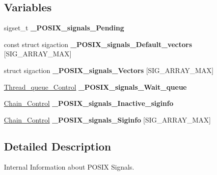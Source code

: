 \subsection*{Variables}
\begin{DoxyCompactItemize}
\item 
\mbox{\label{group__POSIX__SIGNALS_ga9615b840db786240af24ebb295094eac}} 
sigset\+\_\+t {\bfseries \+\_\+\+P\+O\+S\+I\+X\+\_\+signals\+\_\+\+Pending}
\item 
\mbox{\label{group__POSIX__SIGNALS_gaca07bb1b556a5d115a9a7284e7ac6114}} 
const struct sigaction {\bfseries \+\_\+\+P\+O\+S\+I\+X\+\_\+signals\+\_\+\+Default\+\_\+vectors} \mbox{[}S\+I\+G\+\_\+\+A\+R\+R\+A\+Y\+\_\+\+M\+AX\mbox{]}
\item 
\mbox{\label{group__POSIX__SIGNALS_gab2156dbf524bf57a16ec5fc582d2c6e4}} 
struct sigaction {\bfseries \+\_\+\+P\+O\+S\+I\+X\+\_\+signals\+\_\+\+Vectors} \mbox{[}S\+I\+G\+\_\+\+A\+R\+R\+A\+Y\+\_\+\+M\+AX\mbox{]}
\item 
\mbox{\label{group__POSIX__SIGNALS_ga18af9684924978055e56ad21ccf8daa8}} 
\mbox{\hyperlink{structThread__queue__Control}{Thread\+\_\+queue\+\_\+\+Control}} {\bfseries \+\_\+\+P\+O\+S\+I\+X\+\_\+signals\+\_\+\+Wait\+\_\+queue}
\item 
\mbox{\label{group__POSIX__SIGNALS_ga77c534bc6fc0065979f799d8d40a7c71}} 
\mbox{\hyperlink{unionChain__Control}{Chain\+\_\+\+Control}} {\bfseries \+\_\+\+P\+O\+S\+I\+X\+\_\+signals\+\_\+\+Inactive\+\_\+siginfo}
\item 
\mbox{\label{group__POSIX__SIGNALS_ga8d4eb0bcffb14737a3f016a91e7aa7df}} 
\mbox{\hyperlink{unionChain__Control}{Chain\+\_\+\+Control}} {\bfseries \+\_\+\+P\+O\+S\+I\+X\+\_\+signals\+\_\+\+Siginfo} \mbox{[}S\+I\+G\+\_\+\+A\+R\+R\+A\+Y\+\_\+\+M\+AX\mbox{]}
\end{DoxyCompactItemize}


\subsection{Detailed Description}
Internal Information about P\+O\+S\+IX Signals. 



